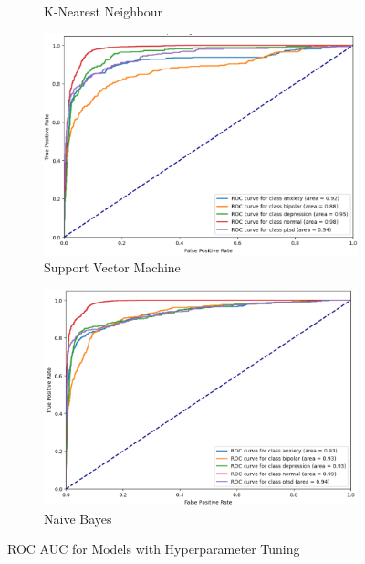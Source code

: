 \begin{figure}[H]
\begin{subfigure}[b]{0.49\textwidth}
        \caption*{K-Nearest Neighbour}
        \label{LSTMROC5}  %
    \end{subfigure}
    \hfill
    \begin{subfigure}[b]{0.49\textwidth}
        \centering
        \includegraphics[width=\textwidth]{Images/HP SVM ROC.png}
        \caption*{Support Vector Machine}
        \label{LSTMROC}  %
    \end{subfigure}
    \hfill
    \begin{subfigure}[b]{0.49\textwidth}
        \centering
        \includegraphics[width=\textwidth]{Images/HP NB ROC.png}
        \caption*{Naive Bayes}
        \label{LSTMROC8}  %
    \end{subfigure}
    \label{fig:hp_lr_comparison}
    \caption*{ROC AUC for Models with Hyperparameter Tuning}
\end{figure}

